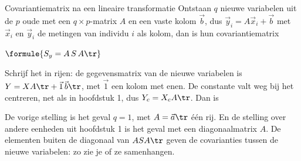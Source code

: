 \begin{theorie}
\begin{stelling}{Covariantiematrix na een lineaire transformatie}
Ontstaan $q$ nieuwe variabelen uit de $p$ oude met een $q \times p$-matrix $A$ en een vaste kolom $\vec b$, dus $\vec y_i = A\vec x_i + \vec b$ met $\vec x_i$ en $\vec y_i$ de metingen van individu $i$ als kolom, dan is hun covariantiematrix

\qquad $\formule{S_y = A\,S\,A\tr}$
\end{stelling}

\begin{bewijs}
Schrijf het in rijen: de gegevensmatrix van de nieuwe variabelen is $Y = XA\tr + \vec 1\,\vec b\tr$, met $\vec 1$ een kolom met enen. De constante valt weg bij het centreren, net als in hoofdstuk 1, dus $Y_c = X_cA\tr$. Dan is
\end{bewijs}
\end{theorie}

De vorige stelling is het geval $q = 1$, met $A = \vec a\tr$ één rij. En de stelling over andere eenheden uit hoofdstuk 1 is het geval met een diagonaalmatrix $A$. De elementen buiten de diagonaal van $ASA\tr$ geven de covarianties tussen de nieuwe variabelen: zo zie je of ze samenhangen.

